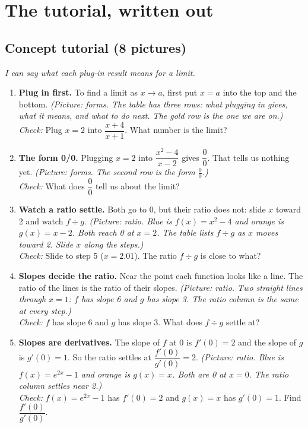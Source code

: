 \documentclass[11pt]{article}
\begin{document}
\section*{The tutorial, written out}
\subsection*{Concept tutorial (8 pictures)}
\textit{I can say what each plug-in result means for a limit.}\par
\begin{enumerate}
\item \textbf{Plug in first.} To find a limit as $x\to a$, first put $x=a$ into the top and the bottom. \textit{(Picture: forms. The table has three rows: what plugging in gives, what it means, and what to do next. The gold row is the one we are on.)}\\ \textit{Check:} Plug $x=2$ into $\dfrac{x+4}{x+1}$. What number is the limit? 
\item \textbf{The form 0/0.} Plugging $x=2$ into $\dfrac{x^2-4}{x-2}$ gives $\dfrac00$. That tells us nothing yet. \textit{(Picture: forms. The second row is the form $\frac00$.)}\\ \textit{Check:} What does $\dfrac00$ tell us about the limit? 
\item \textbf{Watch a ratio settle.} Both go to 0, but their ratio does not: slide $x$ toward 2 and watch $f\div g$. \textit{(Picture: ratio. Blue is $f(x)=x^2-4$ and orange is $g(x)=x-2$. Both reach 0 at $x=2$. The table lists $f\div g$ as $x$ moves toward 2. Slide $x$ along the steps.)}\\ \textit{Check:} Slide to step 5 ($x=2.01$). The ratio $f\div g$ is close to what? 
\item \textbf{Slopes decide the ratio.} Near the point each function looks like a line. The ratio of the lines is the ratio of their slopes. \textit{(Picture: ratio. Two straight lines through $x=1$: $f$ has slope 6 and $g$ has slope 3. The ratio column is the same at every step.)}\\ \textit{Check:} $f$ has slope 6 and $g$ has slope 3. What does $f\div g$ settle at? 
\item \textbf{Slopes are derivatives.} The slope of $f$ at 0 is $f'(0)=2$ and the slope of $g$ is $g'(0)=1$. So the ratio settles at $\dfrac{f'(0)}{g'(0)}=2$. \textit{(Picture: ratio. Blue is $f(x)=e^{2x}-1$ and orange is $g(x)=x$. Both are 0 at $x=0$. The ratio column settles near 2.)}\\ \textit{Check:} $f(x)=e^{2x}-1$ has $f'(0)=2$ and $g(x)=x$ has $g'(0)=1$. Find $\dfrac{f'(0)}{g'(0)}$. 

\end{enumerate}
\end{document}
